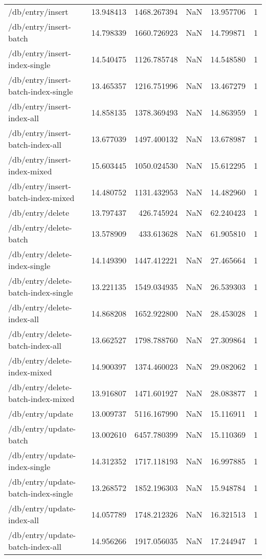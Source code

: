 \begin{longtable}{lrrrrr}
/db/entry/insert & 13.948413 & 1468.267394 & NaN & 13.957706 & 1 \\
/db/entry/insert-batch & 14.798339 & 1660.726923 & NaN & 14.799871 & 1 \\
/db/entry/insert-index-single & 14.540475 & 1126.785748 & NaN & 14.548580 & 1 \\
/db/entry/insert-batch-index-single & 13.465357 & 1216.751996 & NaN & 13.467279 & 1 \\
/db/entry/insert-index-all & 14.858135 & 1378.369493 & NaN & 14.863959 & 1 \\
/db/entry/insert-batch-index-all & 13.677039 & 1497.400132 & NaN & 13.678987 & 1 \\
/db/entry/insert-index-mixed & 15.603445 & 1050.024530 & NaN & 15.612295 & 1 \\
/db/entry/insert-batch-index-mixed & 14.480752 & 1131.432953 & NaN & 14.482960 & 1 \\
/db/entry/delete & 13.797437 & 426.745924 & NaN & 62.240423 & 1 \\
/db/entry/delete-batch & 13.578909 & 433.613628 & NaN & 61.905810 & 1 \\
/db/entry/delete-index-single & 14.149390 & 1447.412221 & NaN & 27.465664 & 1 \\
/db/entry/delete-batch-index-single & 13.221135 & 1549.034935 & NaN & 26.539303 & 1 \\
/db/entry/delete-index-all & 14.868208 & 1652.922800 & NaN & 28.453028 & 1 \\
/db/entry/delete-batch-index-all & 13.662527 & 1798.788760 & NaN & 27.309864 & 1 \\
/db/entry/delete-index-mixed & 14.900397 & 1374.460023 & NaN & 29.082062 & 1 \\
/db/entry/delete-batch-index-mixed & 13.916807 & 1471.601927 & NaN & 28.083877 & 1 \\
/db/entry/update & 13.009737 & 5116.167990 & NaN & 15.116911 & 1 \\
/db/entry/update-batch & 13.002610 & 6457.780399 & NaN & 15.110369 & 1 \\
/db/entry/update-index-single & 14.312352 & 1717.118193 & NaN & 16.997885 & 1 \\
/db/entry/update-batch-index-single & 13.268572 & 1852.196303 & NaN & 15.948784 & 1 \\
/db/entry/update-index-all & 14.057789 & 1748.212326 & NaN & 16.321513 & 1 \\
/db/entry/update-batch-index-all & 14.956266 & 1917.056035 & NaN & 17.244947 & 1 \\

\end{longtable}

